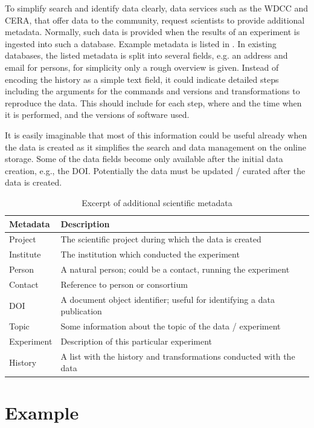 To simplify search and identify data clearly, data services such as the WDCC and CERA, that offer data to the community, request scientists to provide additional metadata.
Normally, such data is provided when the results of an experiment is ingested into such a database.
Example metadata is listed in .
In existing databases, the listed metadata is split into several fields, e.g. an address and email for persons, for simplicity only a rough overview is given.
Instead of encoding the history as a simple text field, it could
indicate detailed steps including the arguments for the commands and versions and transformations to reproduce the data.
This should include for each step, where and the time when it is performed, and the versions of software used.

It is easily imaginable that most of this information could be useful already when the data is created as it simplifies the search and data management on the online storage.
Some of the data fields become only available after the initial data creation, e.g., the DOI.
Potentially the data must be updated / curated after the data is created.

\begin{table}
\begin{tabular}{ll}
Metadata & Description\\
\hline
Project & The scientific project during which the data is created \\
Institute & The institution which conducted the experiment\\
Person &  A natural person; could be a contact, running the experiment \\
Contact & Reference to person or consortium \\
DOI      & A document object identifier; useful for identifying a data publication\\
Topic     & Some information about the topic of the data / experiment \\
Experiment & Description of this particular experiment \\
History & A list with the history and transformations conducted with the data \\
\end{tabular}
\caption{Excerpt of additional scientific metadata}
\label{tbl:additionalMetadata}
\end{table}



\section{Example}

